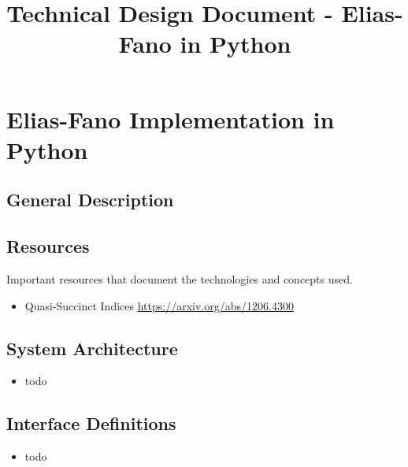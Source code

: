 \documentclass[10pt]{article}
\title{Technical Design Document - Elias-Fano in Python}
\begin{document}
\maketitle

\section{Elias-Fano Implementation in Python}
\subsection{General Description}

\subsection{Resources}
Important resources that document the technologies and concepts used.
\begin{itemize}
\item
  Quasi-Succinct Indices \url{https://arxiv.org/abs/1206.4300}
\end{itemize}

\subsection{System Architecture}
\begin{itemize}
\item
  todo
\end{itemize}

\subsection{Interface Definitions}
\begin{itemize}
\item
  todo
\end{itemize}
\end{document}
